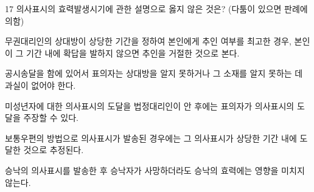 \begin{question}{17}
의사표시의 효력발생시기에 관한 설명으로 옳지 않은 것은? (다툼이 있으면 판례에 의함)
\begin{choices}
  \item 무권대리인의 상대방이 상당한 기간을 정하여 본인에게 추인 여부를 최고한 경우, 본인이 그 기간 내에 확답을 발하지 않으면 추인을 거절한 것으로 본다.
  \item 공시송달을 함에 있어서 표의자는 상대방을 알지 못하거나 그 소재를 알지 못하는 데 과실이 없어야 한다.
  \item 미성년자에 대한 의사표시의 도달을 법정대리인이 안 후에는 표의자가 의사표시의 도달을 주장할 수 있다.
  \item 보통우편의 방법으로 의사표시가 발송된 경우에는 그 의사표시가 상당한 기간 내에 도달한 것으로 추정된다.
  \item 승낙의 의사표시를 발송한 후 승낙자가 사망하더라도 승낙의 효력에는 영향을 미치지 않는다.
\end{choices}
\end{question}
